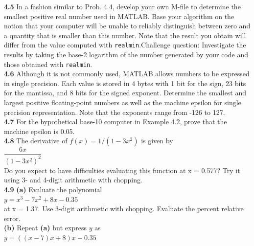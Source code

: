 \documentclass[../main.tex]{subfiles}
\begin{document}
\begin{multicols}{2}
    \noindent\textbf{4.5} In a fashion similar to Prob. 4.4, develop your own
    M-file to determine the smallest positive real number used in
    MATLAB. Base your algorithm on the notion that your computer
    will be unable to reliably distinguish between zero and
    a quantity that is smaller than this number. Note that the
    result you obtain will differ from the value computed with
    \texttt{realmin}.Challenge question: Investigate the results by
    taking the base-2 logarithm of the number generated by your
    code and those obtained with \texttt{realmin}.\\

    \noindent\textbf{4.6} Although it is not commonly used, MATLAB allows
    numbers to be expressed in single precision. Each value
    is stored in 4 bytes with 1 bit for the sign, 23 bits for the
    mantissa, and 8 bits for the signed exponent. Determine the
    smallest and largest positive floating-point numbers as well
    as the machine epsilon for single precision representation.
    Note that the exponents range from -126 to 127.\\

    \noindent\textbf{4.7} For the hypothetical base-10 computer in Example 4.2,
    prove that the machine epsilon is 0.05.\\

    \noindent\textbf{4.8} The derivative of $f(x) = 1/(1-3x^2)$ is given by\\

    $\dfrac{6x}{(1-3x^2)^2}$\\

    \noindent Do you expect to have difficulties evaluating this function
    at x = 0.577? Try it using 3- and 4-digit arithmetic with
    chopping.\\

    \noindent\textbf{4.9} \textbf{(a)} Evaluate the polynomial\\

    $y = x^3 - 7x^2 +8x - 0.35$\\

    \noindent at x = 1.37. Use 3-digit arithmetic with chopping. Evaluate
    the percent relative error.\\
    
    \noindent\textbf{(b)} Repeat \textbf{(a)} but express $y$ as\\

    $y = ((x-7)x+8)x-0.35$\\


\end{multicols}
\end{document}
